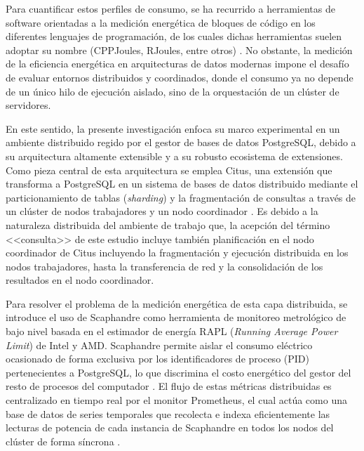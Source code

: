 \documentclass[12pt, letter paper]{report}
\begin{document}
  Para cuantificar estos perfiles de consumo, se ha recurrido a herramientas de
  software orientadas a la medición energética de bloques de código en los
  diferentes lenguajes de programación, de los cuales dichas herramientas suelen
  adoptar su nombre (CPPJoules, RJoules, entre otros) \cite{belgaidpyjoules2019,
  chattarajrjoules2023, scppjoules2024, lelladbjoules2023}. No obstante, la
  medición de la eficiencia energética en arquitecturas de datos modernas impone
  el desafío de evaluar entornos distribuidos y coordinados, donde el consumo ya
  no depende de un único hilo de ejecución aislado, sino de la orquestación de
  un clúster de servidores.

  En este sentido, la presente investigación enfoca su marco experimental en un
  ambiente distribuido regido por el gestor de bases de datos PostgreSQL, debido
  a su arquitectura altamente extensible \cite{postgresql_manual} y a su robusto
  ecosistema de extensiones. Como pieza central de esta arquitectura se emplea
  Citus, una extensión que transforma a PostgreSQL en un sistema de bases de
  datos distribuido mediante el particionamiento de tablas (\textit{sharding}) y
  la fragmentación de consultas a través de un clúster de nodos trabajadores y
  un nodo coordinador \cite{citus_paper, citus_docs}. Es debido a la naturaleza
  distribuida del ambiente de trabajo que, la acepción del término <<consulta>>
  de este estudio incluye también planificación en el nodo coordinador de Citus
  incluyendo la fragmentación y ejecución distribuida en los nodos trabajadores,
  hasta la transferencia de red y la consolidación de los resultados en el nodo
  coordinador.

  Para resolver el problema de la medición energética de esta capa distribuida,
  se introduce el uso de Scaphandre como herramienta de monitoreo metrológico de
  bajo nivel basada en el estimador de energía RAPL (\textit{Running Average
  Power Limit}) de Intel y AMD. Scaphandre permite aislar el consumo eléctrico
  ocasionado de forma exclusiva por los identificadores de proceso (PID)
  pertenecientes a PostgreSQL, lo que discrimina el costo energético del gestor
  del resto de procesos del computador \cite{hubblohubblo-orgscaphandre2025}. El
  flujo de estas métricas distribuidas es centralizado en tiempo real por el
  monitor Prometheus, el cual actúa como una base de datos de series temporales
  que recolecta e indexa eficientemente las lecturas de potencia de cada
  instancia de Scaphandre en todos los nodos del clúster de forma síncrona
  \cite{soundcloudoverview2016}.
\end{document}
